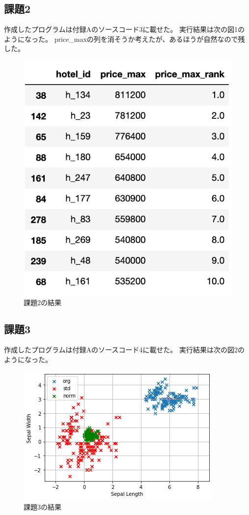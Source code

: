 \documentclass[12pt]{jarticle}
\begin{document}
\subsection{課題2}
作成したプログラムは付録Aのソースコード3に載せた。
実行結果は次の図1のようになった。
price\_maxの列を消そうか考えたが、あるほうが自然なので残した。
\begin{figure}[h]
    \begin{center}
        \includegraphics[scale=0.5]{kadai2_1_1.png}
    \end{center}
    \caption{課題2の結果}
\end{figure}

\clearpage
\subsection{課題3}
作成したプログラムは付録Aのソースコード4に載せた。
実行結果は次の図2のようになった。
\begin{figure}[h]
    \begin{center}
        \includegraphics[scale=0.5]{kadai2_1_2.png}
    \end{center}
    \caption{課題3の結果}
\end{figure}
\end{document}
